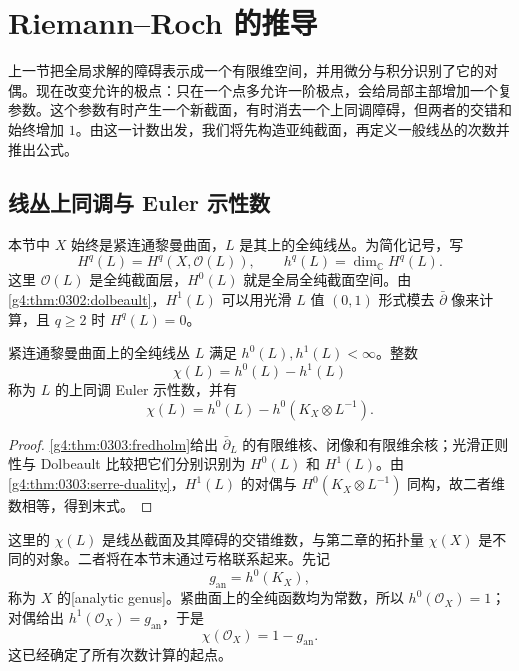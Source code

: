
% 
% 

\section{Riemann–Roch 的推导}
\label{g4:sec:0304}

上一节把全局求解的障碍表示成一个有限维空间，并用微分与积分识别了它的对偶。现在改变允许的极点：只在一个点多允许一阶极点，会给局部主部增加一个复参数。这个参数有时产生一个新截面，有时消去一个上同调障碍，但两者的交错和始终增加 \(1\)。由这一计数出发，我们将先构造亚纯截面，再定义一般线丛的次数并推出公式。

\subsection{线丛上同调与 Euler 示性数}
\label{g4:subsec:0304:01}

本节中 \(X\) 始终是紧连通黎曼曲面，\(L\) 是其上的全纯线丛。为简化记号，写
\[
	H^q(L)=H^q(X,\mathcal O(L)),\qquad h^q(L)=\dim_{\mathbb C}H^q(L).
\]
这里 \(\mathcal O(L)\) 是全纯截面层，\(H^0(L)\) 就是全局全纯截面空间。由\cref{g4:thm:0302:dolbeault}，\(H^1(L)\) 可以用光滑 \(L\) 值 \((0,1)\) 形式模去 \(\bar\partial\) 像来计算，且 \(q\ge2\) 时 \(H^q(L)=0\)。

\begin{proposition}
	\label{g4:prop:0304:finite-euler}
	紧连通黎曼曲面上的全纯线丛 \(L\) 满足 \(h^0(L),h^1(L)<\infty\)。整数
	\[
		\chi(L)=h^0(L)-h^1(L)
	\]
	称为 \(L\) 的上同调 Euler 示性数，并有
	\[
		\chi(L)=h^0(L)-h^0(K_X\otimes L^{-1}).
	\]
\end{proposition}
\begin{proof}
	\cref{g4:thm:0303:fredholm}给出 \(\bar\partial_L\) 的有限维核、闭像和有限维余核；光滑正则性与 Dolbeault 比较把它们分别识别为 \(H^0(L)\) 和 \(H^1(L)\)。由\cref{g4:thm:0303:serre-duality}，\(H^1(L)\) 的对偶与 \(H^0(K_X\otimes L^{-1})\) 同构，故二者维数相等，得到末式。
\end{proof}

这里的 \(\chi(L)\) 是线丛截面及其障碍的交错维数，与第二章的拓扑量 \(\chi(X)\) 是不同的对象。二者将在本节末通过亏格联系起来。先记
\[
	g_{\mathrm{an}}=h^0(K_X),
\]
称为 \(X\) 的[analytic genus]。紧曲面上的全纯函数均为常数，所以 \(h^0(\mathcal O_X)=1\)；对偶给出 \(h^1(\mathcal O_X)=g_{\mathrm{an}}\)，于是
\begin{equation}
	\label{g4:eq:0304:structure-euler}
	\chi(\mathcal O_X)=1-g_{\mathrm{an}}.
\end{equation}
这已经确定了所有次数计算的起点。


